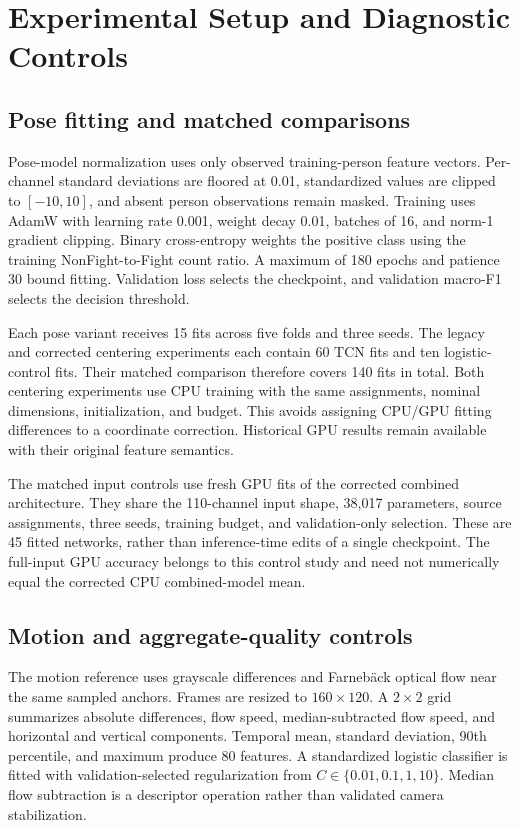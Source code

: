 \section{Experimental Setup and Diagnostic Controls}
\subsection{Pose fitting and matched comparisons}
Pose-model normalization uses only observed training-person feature vectors. Per-channel standard deviations are floored at 0.01, standardized values are clipped to $[-10,10]$, and absent person observations remain masked. Training uses AdamW with learning rate 0.001, weight decay 0.01, batches of 16, and norm-1 gradient clipping. Binary cross-entropy weights the positive class using the training NonFight-to-Fight count ratio. A maximum of 180 epochs and patience 30 bound fitting. Validation loss selects the checkpoint, and validation macro-F1 selects the decision threshold.

Each pose variant receives 15 fits across five folds and three seeds. The legacy and corrected centering experiments each contain 60 TCN fits and ten logistic-control fits. Their matched comparison therefore covers 140 fits in total. Both centering experiments use CPU training with the same assignments, nominal dimensions, initialization, and budget. This avoids assigning CPU/GPU fitting differences to a coordinate correction. Historical GPU results remain available with their original feature semantics.

The matched input controls use fresh GPU fits of the corrected combined architecture. They share the 110-channel input shape, 38,017 parameters, source assignments, three seeds, training budget, and validation-only selection. These are 45 fitted networks, rather than inference-time edits of a single checkpoint. The full-input GPU accuracy belongs to this control study and need not numerically equal the corrected CPU combined-model mean.

\subsection{Motion and aggregate-quality controls}
The motion reference uses grayscale differences and Farneb\"ack optical flow \cite{farneback2003} near the same sampled anchors. Frames are resized to $160\times120$. A $2\times2$ grid summarizes absolute differences, flow speed, median-subtracted flow speed, and horizontal and vertical components. Temporal mean, standard deviation, 90th percentile, and maximum produce 80 features. A standardized logistic classifier is fitted with validation-selected regularization from $C\in\{0.01,0.1,1,10\}$. Median flow subtraction is a descriptor operation rather than validated camera stabilization.

